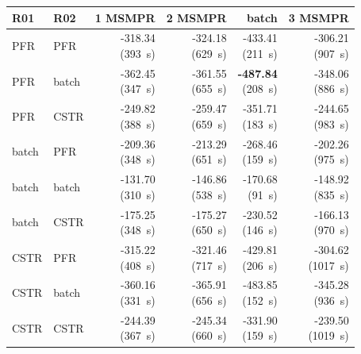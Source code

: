 \begin{tabular}{@{}llrrrr@{}}\toprule
R01 & R02 & 1 MSMPR & 2 MSMPR & batch & 3 MSMPR\\\midrule
PFR & PFR & \makecell{-318.34\\(393~s)} & \makecell{-324.18\\(629~s)} & \makecell{-433.41\\(211~s)} & \makecell{-306.21\\(907~s)} \\
PFR & batch & \makecell{-362.45\\(347~s)} & \makecell{-361.55\\(655~s)} & \makecell{\textbf{-487.84}\\(208~s)} & \makecell{-348.06\\(886~s)} \\
PFR & CSTR & \makecell{-249.82\\(388~s)} & \makecell{-259.47\\(659~s)} & \makecell{-351.71\\(183~s)} & \makecell{-244.65\\(983~s)} \\
batch & PFR & \makecell{-209.36\\(348~s)} & \makecell{-213.29\\(651~s)} & \makecell{-268.46\\(159~s)} & \makecell{-202.26\\(975~s)} \\
batch & batch & \makecell{-131.70\\(310~s)} & \makecell{-146.86\\(538~s)} & \makecell{-170.68\\(91~s)} & \makecell{-148.92\\(835~s)} \\
batch & CSTR & \makecell{-175.25\\(348~s)} & \makecell{-175.27\\(650~s)} & \makecell{-230.52\\(146~s)} & \makecell{-166.13\\(970~s)} \\
CSTR & PFR & \makecell{-315.22\\(408~s)} & \makecell{-321.46\\(717~s)} & \makecell{-429.81\\(206~s)} & \makecell{-304.62\\(1017~s)} \\
CSTR & batch & \makecell{-360.16\\(331~s)} & \makecell{-365.91\\(656~s)} & \makecell{-483.85\\(152~s)} & \makecell{-345.28\\(936~s)} \\
CSTR & CSTR & \makecell{-244.39\\(367~s)} & \makecell{-245.34\\(660~s)} & \makecell{-331.90\\(159~s)} & \makecell{-239.50\\(1019~s)} \\
\bottomrule\end{tabular}
